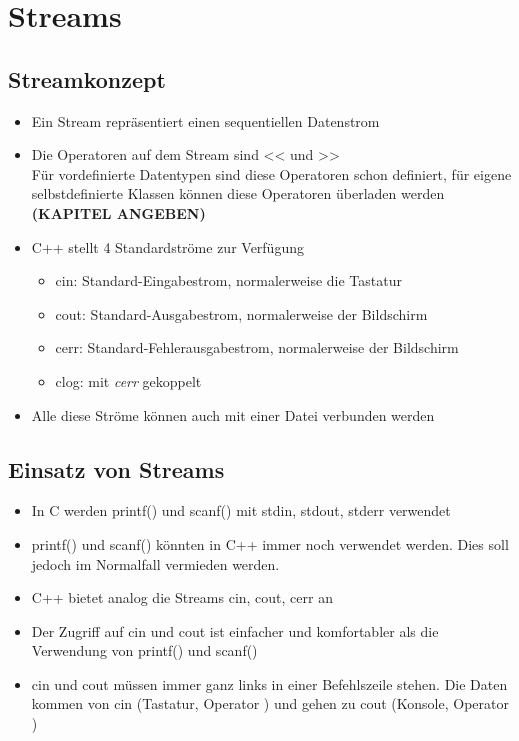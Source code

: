 \section{Streams}
\label{sec:Streams}

\subsection{Streamkonzept}
\label{sec:Streamkonzept}
\begin{itemize}
	\item Ein Stream repräsentiert einen sequentiellen Datenstrom
	\item Die Operatoren auf dem Stream sind << und >>
		\\ Für vordefinierte Datentypen sind diese Operatoren schon definiert, für eigene selbstdefinierte Klassen können diese Operatoren überladen werden \textbf{\color{red}(KAPITEL ANGEBEN)}\color{black}
	\item C++ stellt 4 Standardströme zur Verfügung
	\begin{itemize}
		\item cin:	Standard-Eingabestrom, normalerweise die Tastatur
		\item cout:	Standard-Ausgabestrom, normalerweise der Bildschirm
		\item cerr:	Standard-Fehlerausgabestrom, normalerweise der Bildschirm
		\item clog: mit \emph{cerr} gekoppelt
	\end{itemize}
	\item Alle diese Ströme können auch mit einer Datei verbunden werden
\end{itemize}

\subsection{Einsatz von Streams}
\label{sec:Einsatz von Streams}
\begin{itemize}
	\item In C werden printf() und scanf() mit stdin, stdout, stderr verwendet
	\item printf() und scanf() könnten in C++ immer noch verwendet werden. Dies soll jedoch im Normalfall vermieden werden.
	\item C++ bietet analog die Streams cin, cout, cerr an
	\item Der Zugriff auf cin und cout ist einfacher und komfortabler als die Verwendung von printf() und scanf()
	\item cin und cout müssen immer ganz links in einer Befehlszeile stehen. Die Daten kommen von cin (Tastatur, Operator \frq\frq) und gehen zu cout (Konsole, Operator \flq\flq)
\end{itemize}

